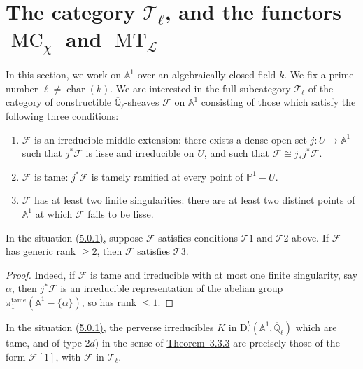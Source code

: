 \section{The category \texorpdfstring{\(\mathcal{T}_\ell\)}{T ell}, and the
functors \texorpdfstring{\(\operatorname{MC}_\chi\)}{MC chi} and
\texorpdfstring{\(\operatorname{MT}_{\mathcal{L}}\)}{MT L}}
\label{sec:5.1}

In this section, we work on \(\mathbb{A}^1\) over an algebraically closed
field \(k\). We fix a prime number \(\ell\neq\operatorname{char}(k)\). We are
interested in the full subcategory \(\mathcal{T}_\ell\) of the category of
constructible \(\overline{\mathbb{Q}}_\ell\)-sheaves \(\mathcal{F}\) on
\(\mathbb{A}^1\) consisting of those which satisfy the following three
conditions:
\begin{enumerate}[label={\(\mathcal{T}\arabic*\)}]
\item \(\mathcal{F}\) is an irreducible middle extension: there exists a dense
open set \(j:U\to\mathbb{A}^1\) such that \(j^*\mathcal{F}\) is lisse and
irreducible on \(U\), and such that \(\mathcal{F}\cong j_*j^*\mathcal{F}\).

\item \(\mathcal{F}\) is tame: \(j^*\mathcal{F}\) is tamely ramified at every
point of \(\mathbb{P}^1-U\).

\item \(\mathcal{F}\) has at least two finite singularities: there are at least
two distinct points of \(\mathbb{A}^1\) at which \(\mathcal{F}\) fails to be
lisse.
\end{enumerate}

In the situation \hyperref[par:5.0.1]{(5.0.1)}, suppose \(\mathcal{F}\)
satisfies conditions \(\mathcal{T}1\) and \(\mathcal{T}2\) above. If
\(\mathcal{F}\) has generic rank \(\geq 2\), then \(\mathcal{F}\) satisfies
\(\mathcal{T}3\).

\begin{proof}
Indeed, if \(\mathcal{F}\) is tame and irreducible with at most one finite
singularity, say \(\alpha\), then \(j^*\mathcal{F}\) is an irreducible
representation of the abelian group
\(\pi_1^{\mathrm{tame}}(\mathbb{A}^1-\{\alpha\})\), so has rank \(\leq 1\).
\end{proof}

In the situation \hyperref[par:5.0.1]{(5.0.1)}, the perverse irreducibles
\(K\) in \(\mathrm{D}^b_c(\mathbb{A}^1,\overline{\mathbb{Q}}_\ell)\) which are
tame, and of type \(2d\)) in the sense of
\hyperref[thm:3.3.3]{Theorem~3.3.3} are precisely those of the form
\(\mathcal{F}[1]\), with \(\mathcal{F}\) in \(\mathcal{T}_\ell\).


